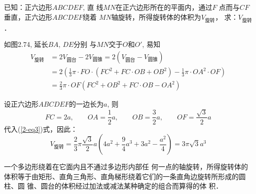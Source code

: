 \begin{example}
    已知：正六边形$ABCDEF$, 直
线$MN$在正六边形所在的平面内，通过$F$
点而与$CF$垂直，正六边形$ABCDEF$绕着
$MN$轴旋转，所得旋转体的体积为$V_{\text{旋转}}$，
求：$V_{\text{旋转}}$．
\end{example}


\begin{figure}[htp]
    \centering
{}
    \caption{}
\end{figure}

\begin{solution}
如图2.74, 延长$BA$, $DE$分别
与$MN$交于$O$和$O'$, 易知
\begin{equation}\label{2-eq3}
\begin{split}
    V_{\text{旋转}}&=2V_{\text{圆台}}-2V_{\text{圆锥}}=2\left(V_{\text{圆台}}-V_{\text{圆锥}}\right)\\
    &=2\left(\frac{1}{3}\pi\cdot FO\cdot (FC^2+FC\cdot OB+OB^2)-\frac{1}{3}\pi \cdot OA^2 \cdot OF\right)\\
    &=\frac{2}{3}\pi \cdot OF (FC^2+OB^2+FC\cdot OB-OA^2)
\end{split}
\end{equation}

设正六边形$ABCDEF$的一边长为$a$, 
则
\[FC=2a,\qquad OA=\frac{1}{2}a,\qquad OB=\frac{3}{2}a,\qquad OF=\frac{\sqrt{3}}{2}a\]
代入(\ref{2-eq3})式，因此：
\[V_{\text{旋转}}=\frac{2}{3}\pi \frac{\sqrt{3}}{2}a\left(4a^2+\frac{9}{4}a^3+3a^2-\frac{a^2}{4}\right)
=3\pi \sqrt{3}a^3\]
\end{solution}


\begin{rmk}
    一个多边形绕着在它面内且不通过多边形内部任
何一点的轴旋转，所得旋转体的体积等于由矩形、直角三角形、直角梯形绕着它们的一条直角边旋转所形成的圆柱、圆
锥、圆台的体积经过加法或减法某种确定的组合而算得的体
积．
\end{rmk}

